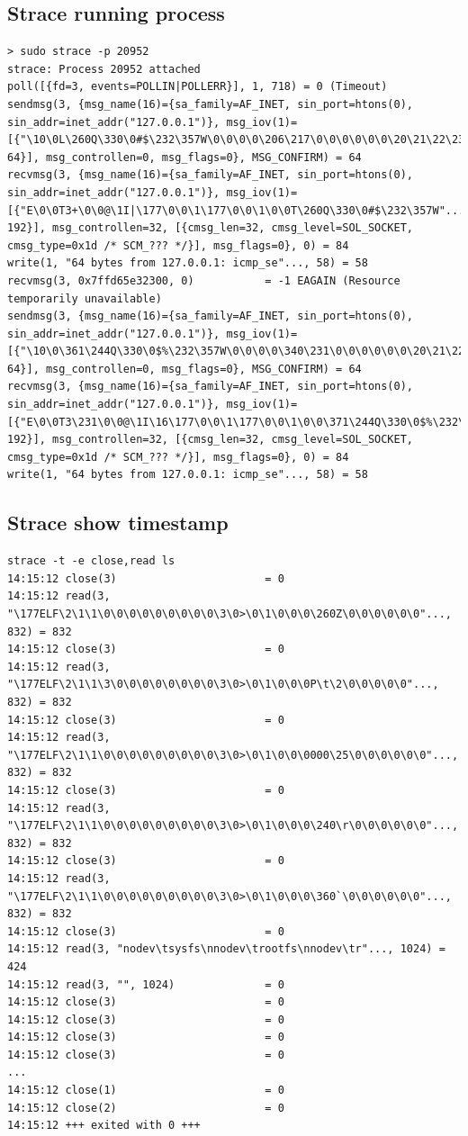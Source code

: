 \documentclass[10pt]{article}
\begin{document}
\subsection{Strace running process}
\begin{verbatim}
> sudo strace -p 20952
strace: Process 20952 attached
poll([{fd=3, events=POLLIN|POLLERR}], 1, 718) = 0 (Timeout)
sendmsg(3, {msg_name(16)={sa_family=AF_INET, sin_port=htons(0), sin_addr=inet_addr("127.0.0.1")}, msg_iov(1)=[{"\10\0L\260Q\330\0#$\232\357W\0\0\0\0\206\217\0\0\0\0\0\0\20\21\22\23\24\25\26\27"..., 64}], msg_controllen=0, msg_flags=0}, MSG_CONFIRM) = 64
recvmsg(3, {msg_name(16)={sa_family=AF_INET, sin_port=htons(0), sin_addr=inet_addr("127.0.0.1")}, msg_iov(1)=[{"E\0\0T3+\0\0@\1I|\177\0\0\1\177\0\0\1\0\0T\260Q\330\0#$\232\357W"..., 192}], msg_controllen=32, [{cmsg_len=32, cmsg_level=SOL_SOCKET, cmsg_type=0x1d /* SCM_??? */}], msg_flags=0}, 0) = 84
write(1, "64 bytes from 127.0.0.1: icmp_se"..., 58) = 58
recvmsg(3, 0x7ffd65e32300, 0)           = -1 EAGAIN (Resource temporarily unavailable)
sendmsg(3, {msg_name(16)={sa_family=AF_INET, sin_port=htons(0), sin_addr=inet_addr("127.0.0.1")}, msg_iov(1)=[{"\10\0\361\244Q\330\0$%\232\357W\0\0\0\0\340\231\0\0\0\0\0\0\20\21\22\23\24\25\26\27"..., 64}], msg_controllen=0, msg_flags=0}, MSG_CONFIRM) = 64
recvmsg(3, {msg_name(16)={sa_family=AF_INET, sin_port=htons(0), sin_addr=inet_addr("127.0.0.1")}, msg_iov(1)=[{"E\0\0T3\231\0\0@\1I\16\177\0\0\1\177\0\0\1\0\0\371\244Q\330\0$%\232\357W"..., 192}], msg_controllen=32, [{cmsg_len=32, cmsg_level=SOL_SOCKET, cmsg_type=0x1d /* SCM_??? */}], msg_flags=0}, 0) = 84
write(1, "64 bytes from 127.0.0.1: icmp_se"..., 58) = 58
\end{verbatim}

\subsection{Strace show timestamp}
\begin{verbatim}
strace -t -e close,read ls
14:15:12 close(3)                       = 0
14:15:12 read(3, "\177ELF\2\1\1\0\0\0\0\0\0\0\0\0\3\0>\0\1\0\0\0\260Z\0\0\0\0\0\0"..., 832) = 832
14:15:12 close(3)                       = 0
14:15:12 read(3, "\177ELF\2\1\1\3\0\0\0\0\0\0\0\0\3\0>\0\1\0\0\0P\t\2\0\0\0\0\0"..., 832) = 832
14:15:12 close(3)                       = 0
14:15:12 read(3, "\177ELF\2\1\1\0\0\0\0\0\0\0\0\0\3\0>\0\1\0\0\0000\25\0\0\0\0\0\0"..., 832) = 832
14:15:12 close(3)                       = 0
14:15:12 read(3, "\177ELF\2\1\1\0\0\0\0\0\0\0\0\0\3\0>\0\1\0\0\0\240\r\0\0\0\0\0\0"..., 832) = 832
14:15:12 close(3)                       = 0
14:15:12 read(3, "\177ELF\2\1\1\0\0\0\0\0\0\0\0\0\3\0>\0\1\0\0\0\360`\0\0\0\0\0\0"..., 832) = 832
14:15:12 close(3)                       = 0
14:15:12 read(3, "nodev\tsysfs\nnodev\trootfs\nnodev\tr"..., 1024) = 424
14:15:12 read(3, "", 1024)              = 0
14:15:12 close(3)                       = 0
14:15:12 close(3)                       = 0
14:15:12 close(3)                       = 0
14:15:12 close(3)                       = 0
...
14:15:12 close(1)                       = 0
14:15:12 close(2)                       = 0
14:15:12 +++ exited with 0 +++
\end{verbatim}
\end{document}
